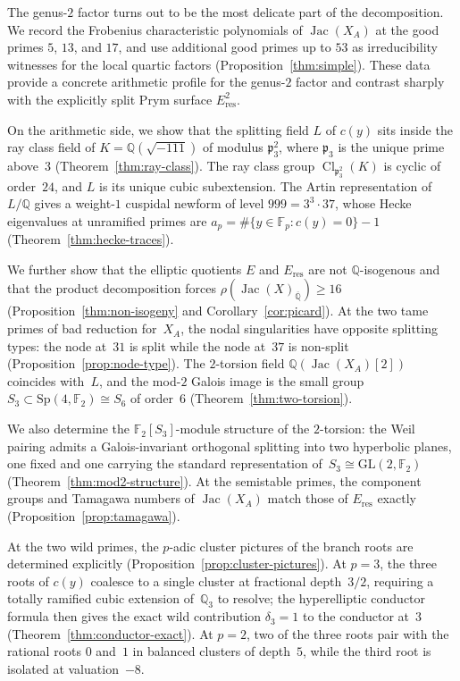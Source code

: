 \documentclass[11pt,letterpaper]{article}
\theoremstyle{plain}
\theoremstyle{remark}
\newcommand{\QQ}{\mathbb{Q}}
\newcommand{\Jac}{\operatorname{Jac}}
\newcommand{\Cl}{\operatorname{Cl}}
\newcommand{\F}{\mathbb{F}}
\begin{document}
The genus-\(2\) factor turns out to be the most delicate part of the decomposition. We record the Frobenius characteristic polynomials of \(\Jac(X_A)\) at the good primes \(5\), \(13\), and \(17\), and use additional good primes up to \(53\) as irreducibility witnesses for the local quartic factors (Proposition~\ref{thm:simple}). These data provide a concrete arithmetic profile for the genus-\(2\) factor and contrast sharply with the explicitly split Prym surface \(E_{\mathrm{res}}^2\).

On the arithmetic side, we show that the splitting field \(L\) of \(c(y)\) sits inside the ray class field of \(K=\QQ(\sqrt{-111})\) of modulus \(\mathfrak{p}_3^2\), where \(\mathfrak{p}_3\) is the unique prime above~\(3\) (Theorem~\ref{thm:ray-class}). The ray class group \(\Cl_{\mathfrak{p}_3^2}(K)\) is cyclic of order~\(24\), and \(L\) is its unique cubic subextension. The Artin representation of \(L/\QQ\) gives a weight-\(1\) cuspidal newform of level \(999=3^3\cdot 37\), whose Hecke eigenvalues at unramified primes are \(a_p=\#\{y\in\F_p:c(y)=0\}-1\) (Theorem~\ref{thm:hecke-traces}).

We further show that the elliptic quotients \(E\) and \(E_{\mathrm{res}}\) are not \(\QQ\)-isogenous and that the product decomposition forces \(\rho(\Jac(X)_{\overline{\QQ}})\geq 16\) (Proposition~\ref{thm:non-isogeny} and Corollary~\ref{cor:picard}). At the two tame primes of bad reduction for~\(X_A\), the nodal singularities have opposite splitting types: the node at~\(31\) is split while the node at~\(37\) is non-split (Proposition~\ref{prop:node-type}). The \(2\)-torsion field \(\QQ(\Jac(X_A)[2])\) coincides with~\(L\), and the mod-\(2\) Galois image is the small group \(S_3\subset\mathrm{Sp}(4,\F_2)\cong S_6\) of order~\(6\) (Theorem~\ref{thm:two-torsion}).

We also determine the \(\F_2[S_3]\)-module structure of the \(2\)-torsion: the Weil pairing admits a Galois-invariant orthogonal splitting into two hyperbolic planes, one fixed and one carrying the standard representation of~\(S_3\cong\mathrm{GL}(2,\F_2)\) (Theorem~\ref{thm:mod2-structure}). At the semistable primes, the component groups and Tamagawa numbers of \(\Jac(X_A)\) match those of \(E_{\mathrm{res}}\) exactly (Proposition~\ref{prop:tamagawa}).

At the two wild primes, the \(p\)-adic cluster pictures of the branch roots are determined explicitly (Proposition~\ref{prop:cluster-pictures}). At \(p=3\), the three roots of \(c(y)\) coalesce to a single cluster at fractional depth~\(3/2\), requiring a totally ramified cubic extension of~\(\QQ_3\) to resolve; the hyperelliptic conductor formula then gives the exact wild contribution \(\delta_3=1\) to the conductor at~\(3\) (Theorem~\ref{thm:conductor-exact}). At \(p=2\), two of the three roots pair with the rational roots \(0\) and~\(1\) in balanced clusters of depth~\(5\), while the third root is isolated at valuation~\(-8\).
\end{document}
